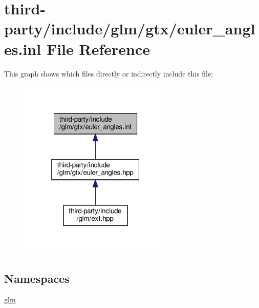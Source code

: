 \hypertarget{euler__angles_8inl}{}\section{third-\/party/include/glm/gtx/euler\+\_\+angles.inl File Reference}
\label{euler__angles_8inl}
This graph shows which files directly or indirectly include this file\+:
\nopagebreak
\begin{figure}[H]
\begin{center}
\leavevmode
\includegraphics[width=208pt]{euler__angles_8inl__dep__incl}
\end{center}
\end{figure}
\subsection*{Namespaces}
\begin{DoxyCompactItemize}
\item 
 \hyperlink{namespaceglm}{glm}
\end{DoxyCompactItemize}

